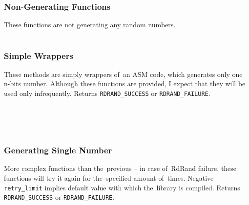 \subsubsection{Non-Generating Functions}

These functions are not generating any random numbers.\\

\\

\subsubsection{Simple Wrappers}\label{subsec:api:simple-wrappers}
\par{
These methods are simply wrappers of~an ASM code, which generates only one n-bits number. Although these functions are provided, I expect that they will be used only infrequently. Returns {\tt RDRAND\_SUCCESS} or {\tt RDRAND\_FAILURE}.\\
}

\\

\\

\\

\subsubsection{Generating Single Number}\label{subsec:api:single-number}
\par{
More complex functions than the~previous -- in case of~RdRand failure, these functions will try it again for the~specified amount of~times. Negative {\tt retry\_limit} implies default value with which the~library is compiled. Returns {\tt RDRAND\_SUCCESS} or {\tt RDRAND\_FAILURE}.\\
}

\\

